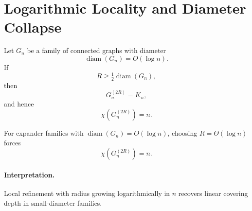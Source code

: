 \section{Logarithmic Locality and Diameter Collapse}

\begin{theorem}
Let $G_n$ be a family of connected graphs with diameter
\[
\operatorname{diam}(G_n) = O(\log n).
\]
If
\[
R \ge \tfrac{1}{2}\operatorname{diam}(G_n),
\]
then
\[
G_n^{(2R)} = K_n,
\]
and hence
\[
\chi(G_n^{(2R)}) = n.
\]
\end{theorem}

\begin{corollary}
For expander families with $\operatorname{diam}(G_n)=O(\log n)$,
choosing $R=\Theta(\log n)$ forces
\[
\chi(G_n^{(2R)}) = n.
\]
\end{corollary}

\paragraph{Interpretation.}
Local refinement with radius growing logarithmically in $n$
recovers linear covering depth in small-diameter families.
